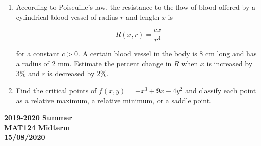 \documentclass[a4paper, 12pt]{article}
\begin{document}
\begin{enumerate}[leftmargin=*,label=\textbf{\arabic*.}]
where $u=(x,y)$ and $v=v(x,y)$.

Let $x=r\cos\theta$ and $y=r\sin\theta$. Show that the Cauchy-Riemann equations take the form
\[\frac{\partial u}{\partial r} = \frac{1}{r} \frac{\partial v}{\partial\theta} \quad\text{and}\quad\frac1r\frac{\partial u}{\partial\theta}=-\frac{\partial v}{\partial r}.\]

\newpage

\item According to Poiseuille’s law, the resistance to the flow of blood offered by a cylindrical blood vessel of radius $r$ and length $x$ is

\[R(x,r) = \frac{cx}{r^4}\]

for a constant $c > 0$. A certain blood vessel in the body is 8 cm long and has a radius of $2$ mm. Estimate the percent change in $R$ when $x$ is increased by $3\%$ and $r$ is decreased by $2\%$.

\item Find the critical points of $f(x, y)=-x^3+9x-4y^2$ and classify each point as a relative maximum, a relative minimum, or a saddle point.

\end{enumerate}

\newpage
{}
{}
\begin{center}
\textbf{2019-2020 Summer\\MAT124 Midterm\\15/08/2020}
\end{center}
\end{document}
